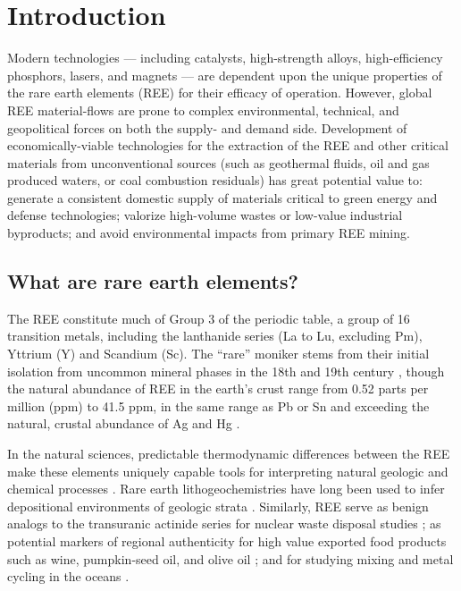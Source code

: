 \chapter{Introduction}
\vspace{-1cm}

Modern technologies --- including catalysts, high-strength alloys, high-efficiency phosphors, lasers, and magnets --- are dependent upon the unique properties of the rare earth elements (REE) for their efficacy of operation.
However, global REE material-flows are prone to complex environmental, technical, and geopolitical forces on both the supply- and demand side.
Development of economically-viable technologies for the extraction of the REE and other critical materials from unconventional sources (such as geothermal fluids, oil and gas produced waters, or coal combustion residuals) has great potential value to: generate a consistent domestic supply of materials critical to green energy and defense technologies; valorize high-volume wastes or low-value industrial byproducts; and avoid environmental impacts from primary REE mining.

\section{What are rare earth elements?}
The REE constitute much of Group 3 of the periodic table, a group of 16 transition metals, including the lanthanide series (La to Lu, excluding Pm), Yttrium (Y) and Scandium (Sc).
The ``rare'' moniker stems from their initial isolation from uncommon mineral phases in the 18th and 19th century \citep{CastorHedrick},
though the natural abundance of REE in the earth's crust range from 0.52 parts per million (ppm) to 41.5 ppm, in the same range as Pb or Sn and exceeding the natural, crustal abundance of Ag and Hg \citep{CRC}.

In the natural sciences, predictable thermodynamic differences between the REE make these elements uniquely capable tools for interpreting natural geologic and chemical processes \citep{Murray_Geol_1990, Laveuf_Geoderma_2009}.
Rare earth lithogeochemistries have long been used to infer depositional environments of geologic strata \citep{Murray_Geol_1990, PAAS, Hanson_AREPS_1980}.
Similarly, REE serve as benign analogs to the transuranic actinide series for nuclear waste disposal studies \citep{Krauskopf_CG_1986, Millero_GCA_1992};
as potential markers of regional authenticity for high value exported food products such as wine, pumpkin-seed oil, and olive oil \citep{Jakubowski_FJAC_1999, Joebstl_FC_2010, Farmaki_AL_2012};
and for studying mixing and metal cycling in the oceans \citep{DeBaar_Nature_1983, Elderfield_PTRS_1988}.


